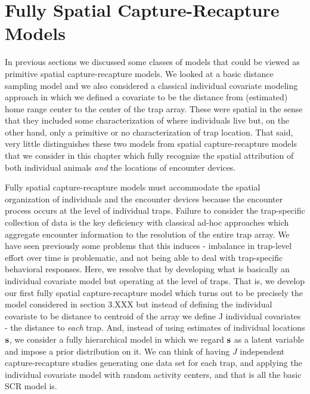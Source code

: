 


\chapter{Fully Spatial Capture-Recapture Models}
\label{chapt.scrmodels}

\vspace{.3in}

In previous sections we discussed some classes of models that could be
viewed as primitive spatial capture-recapture models. We looked at a
basic distance sampling model and we also considered a classical
individual covariate modeling approach in which we defined a covariate
to be the distance from (estimated) home range center to the center of
the trap array. These were spatial in the sense that they included
some characterization of where individuals live but, on the other
hand, only a primitive or no characterization of trap location.  That
said, very little distinguishes these two models from spatial
capture-recapture models that we consider in this chapter which fully
recognize the spatial attribution of both individual animals {\it and}
the locations of encounter devices.

Fully spatial capture-recapture models must accommodate the spatial
organization of individuals and the encounter devices because the
encounter process occurs at the level of individual traps.  Failure to
consider the trap-specific collection of data is the key deficiency
with classical ad-hoc approaches which aggregate encounter information
to the resolution of the entire trap array. We have seen previously
some problems that this induces - imbalance in trap-level effort over
time is problematic, and not being able to deal with trap-specific
behavioral responses.  Here, we resolve that by developing what is
basically an individual covariate model but operating at the level of
traps. That is, we develop our first fully spatial capture-recapture
model which turns out to be precisely the model considered in section
3.XXX but instead of defining the individual covariate to be distance
to centroid of the array we define J individual covariates - the
distance to {\it each} trap. And, instead of using estimates of
individual locations ${\bf s}$, we consider a fully hierarchical model in
which we regard ${\bf s}$ as a latent variable and impose a prior
distribution on it.  We can think of having $J$ independent
capture-recapture studies generating one data set for each trap, and
applying the individual covariate model with random activity centers,
and that is all the basic SCR model is.


